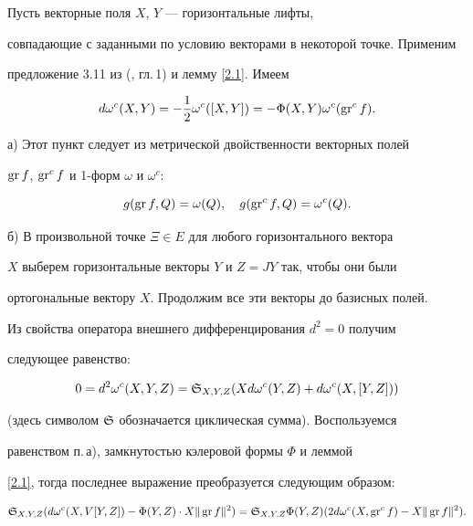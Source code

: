 \begin{pf} Пусть векторные поля $X$, $Y$ --- горизонтальные лифты,


совпадающие с заданными по условию векторами в некоторой точке. Применим


предложение 3.11 из (\cite{KN1}, гл.\,1) и лемму \ref{2.1}. Имеем


$$


d\omega^c(X,Y)=-\frac12\omega^c([X,Y])=-\Phi (X,Y)\omega^c(\gr^c f).


$$


а) Этот пункт следует из метрической двойственности векторных полей


$\operatorname{gr} f$, $\operatorname{gr}^c f$ и 1-форм $\omega$ и $\omega^c$:


\begin{equation}


g(\GR f,Q)=\omega (Q),\quad g(\gr^c f,Q)=\omega^c(Q).


\label{3.8}


\end{equation}


б) В произвольной точке $\Xi \in E$ для любого горизонтального вектора


$X$ выберем горизонтальные векторы $Y$ и $Z=JY$ так, чтобы они были


ортогональные вектору $X$. Продолжим все эти векторы до базисных полей.


Из свойства оператора внешнего дифференцирования $d^2=0$ получим


следующее равенство:


$$


0=d^2\omega^c(X,Y,Z)=\frak S_ {X,Y,Z}( Xd\omega^c(Y,Z)+


d\omega^c(X,[Y,Z]))


$$


(здесь символом $\frak S$ обозначается циклическая сумма). Воспользуемся


равенством п.\,а), замкнутостью кэлеровой формы $\Phi$ и леммой


\ref{2.1}, тогда последнее выражение преобразуется следующим образом:


$$


\frak S_{X,Y,Z}( d\omega^c(X,V[Y,Z])-


\Phi (Y,Z)\cdot X\|\GR f \|^2) =


\frak S_{X,Y,Z}\Phi (Y,Z)( 2d\omega^c(X,\gr^c f)-


X\|\GR f \|^2).


$$



\end{pf}
